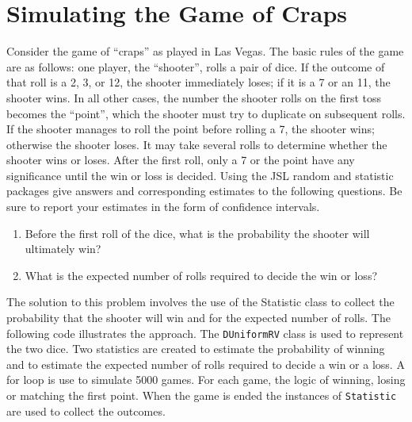 \documentclass[
]{book}
\providecommand{\tightlist}{%
  \setlength{\itemsep}{0pt}\setlength{\parskip}{0pt}}
\theoremstyle{definition}
\theoremstyle{definition}
\theoremstyle{definition}
\theoremstyle{definition}
\theoremstyle{remark}
\begin{document}
\hypertarget{craps}{%
\section{Simulating the Game of Craps}\label{craps}}

Consider the game of ``craps'' as played in Las Vegas. The basic rules of the game are as follows: one player, the ``shooter'', rolls a pair of dice. If the outcome of that roll is a 2, 3, or 12, the shooter immediately loses; if it is a 7 or an 11, the shooter wins. In all other cases, the number the shooter rolls on the first toss becomes the ``point'', which the shooter must try to duplicate on subsequent rolls. If the shooter manages to roll the point before rolling a 7, the shooter wins; otherwise the shooter loses. It may take several rolls to determine whether the shooter wins or loses. After the first roll, only a 7 or the point have any significance until the win or loss is decided. Using the JSL random and statistic packages give answers and corresponding estimates to the following questions. Be sure to report your estimates in the form of confidence intervals.

\begin{enumerate}
\def\labelenumi{\alph{enumi})}
\tightlist
\item
  Before the first roll of the dice, what is the probability the shooter will ultimately win?
\item
  What is the expected number of rolls required to decide the win or loss?
\end{enumerate}

The solution to this problem involves the use of the Statistic class to collect the probability that the shooter will win and for the expected number of rolls. The following code illustrates the approach. The \texttt{DUniformRV} class is used to represent the two dice. Two statistics are created to estimate the probability of winning and to estimate the expected number of rolls required to decide a win or a loss. A for loop is use to simulate 5000 games. For each game, the logic of winning, losing or matching the first point. When the game is ended the instances of \texttt{Statistic} are used to collect the outcomes.
\end{document}
